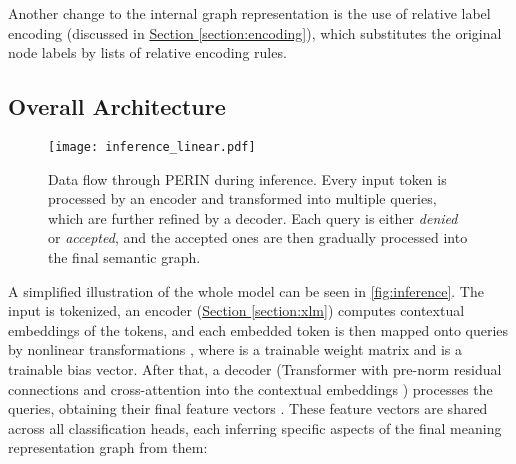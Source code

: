 \documentclass[11pt,a4paper]{article}
\newcommand{\secref}[1]{\hyperref[#1]{Section \ref*{#1}}}
\begin{document}
Another change to the internal graph representation is the use of relative label encoding (discussed in \secref{section:encoding}), which substitutes the original node labels by lists of relative encoding rules.

 \subsection{Overall Architecture}
\label{sec:overall_architecture}

\begin{figure}[t]
\texttt{[image: inference\_linear.pdf]}
\caption{Data flow through PERIN during inference. Every input token is processed by an encoder and transformed into multiple queries, which are further refined by a decoder. Each query is either \emph{denied} or \emph{accepted}, and the accepted ones are then gradually processed into the final semantic graph.}
\label{fig:inference}
\end{figure}


A simplified illustration of the whole model can be seen in \autoref{fig:inference}. The input is tokenized, an
encoder (\secref{section:xlm}) computes
contextual embeddings of the tokens, and each embedded token  is then mapped onto  queries by nonlinear transformations , where  is a trainable weight matrix and  is a trainable bias vector. After that, a decoder (Transformer with pre-norm residual connections \cite{nguyen2019transformers} and cross-attention into the contextual embeddings ) processes the queries, obtaining their final feature vectors . These feature vectors are shared across all classification heads, each inferring specific aspects of the final meaning representation graph from them:
\end{document}
